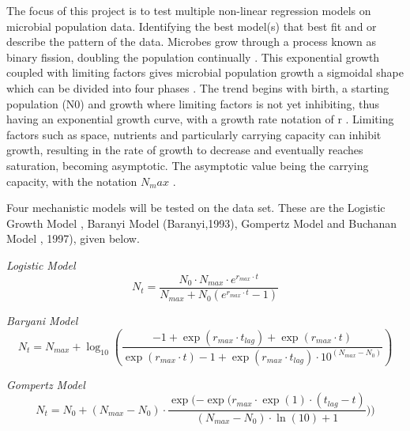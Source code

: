 The focus of this project is to test multiple non-linear regression models on microbial population data. Identifying the best model(s) that best fit and or describe the pattern of the data. Microbes grow through a process known as binary fission, doubling the population continually \cite{webb1986logistic}. This exponential growth coupled with limiting factors gives microbial population growth a sigmoidal shape which can be divided into four phases \cite{peleg2011microbial}. The trend begins with birth, a starting population (N0) and growth where limiting factors is not yet inhibiting, thus having an exponential growth curve, with a growth rate notation of r \cite{zwietering1990modeling}. Limiting factors such as space, nutrients and particularly carrying capacity can inhibit growth, resulting in the rate of growth to decrease and eventually reaches saturation, becoming asymptotic. The asymptotic value being the carrying capacity, with the notation $N_max$ \cite{zwietering1990modeling}.

Four mechanistic models will be tested on the data set. These are the Logistic Growth Model \cite{bacaer2011verhulst}, Baranyi Model (Baranyi,1993), Gompertz Model \cite{zwietering1990modeling} and Buchanan Model \cite{buchanan1997simple}, 1997), given below.

\textit{Logistic Model}
\begin{equation*}
    N_t = \frac{N_0 \cdot N_{max} \cdot e^{r_{max} \cdot t}}{N_{max} + N_0(e^{r_{max} \cdot t} -1)} \label{eq:Logistic Model} \tag{1.1}
\end{equation*}

\textit{Baryani Model}
\begin{equation*}
    N_t = N_{max} + \log_{10}(\frac{-1 + \exp(r_{max} \cdot t_{lag}) + \exp(r_{max} \cdot t)}{\exp(r_{max} \cdot t) - 1 + \exp(r_{max} \cdot t_{lag}) \cdot 10^(N_{max} - N_0)}) \label{eq:Baranyi Model} \tag{1.2}
\end{equation*}

\textit{Gompertz Model}
\begin{equation*}
    N_t =  N_0 + (N_{max} - N_0) \cdot \frac{\exp(-\exp(r_{max} \cdot \exp(1) \cdot (t_{lag} - t)}{(N_{max} - N_0) \cdot \ln(10) + 1})) \label{eq:Gompertz Model} \tag{1.3}
\end{equation*}

